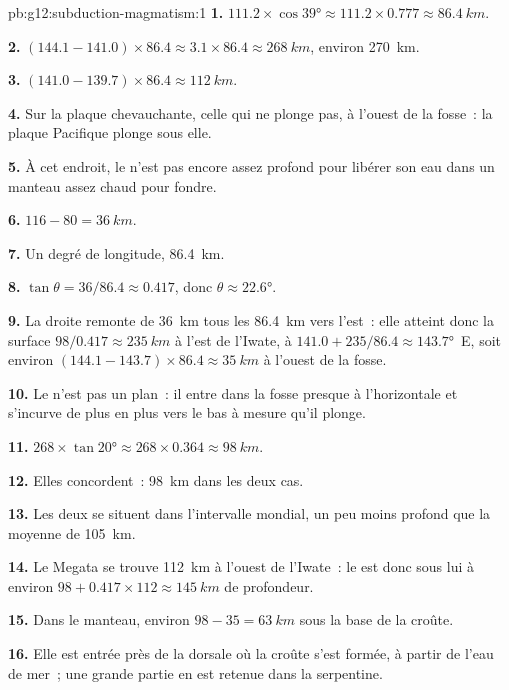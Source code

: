 \begin{solution}{pb:g12:subduction-magmatism:1}
\textbf{1.} $111.2 \times \cos\ang{39} \approx 111.2 \times 0.777 \approx
\qty{86.4}{km}$.

\textbf{2.} $(144.1 - 141.0) \times 86.4 \approx 3.1 \times 86.4 \approx
\qty{268}{km}$, environ \qty{270}{km}.

\textbf{3.} $(141.0 - 139.7) \times 86.4 \approx \qty{112}{km}$.

\textbf{4.} Sur la plaque chevauchante, celle qui ne plonge pas, à l'ouest
de la fosse~: la plaque Pacifique plonge sous elle.

\textbf{5.} À cet endroit, le  n'est pas encore assez
profond pour libérer son eau dans un manteau assez chaud pour fondre.

\textbf{6.} $116 - 80 = \qty{36}{km}$.

\textbf{7.} Un degré de longitude, \qty{86.4}{km}.

\textbf{8.} $\tan\theta = 36/86.4 \approx 0.417$, donc $\theta \approx
\ang{22.6}$.

\textbf{9.} La droite remonte de \qty{36}{km} tous les \qty{86.4}{km} vers
l'est~: elle atteint donc la surface $98/0.417 \approx \qty{235}{km}$ à
l'est de l'Iwate, à $141.0 + 235/86.4 \approx \ang{143.7}$~E, soit environ $(144.1 - 143.7) \times 86.4
\approx \qty{35}{km}$ à l'ouest de la fosse.

\textbf{10.} Le  n'est pas un plan~: il entre dans la fosse presque
à l'horizontale et s'incurve de plus en plus vers le bas à mesure qu'il
plonge.

\textbf{11.} $268 \times \tan\ang{20} \approx 268 \times 0.364 \approx
\qty{98}{km}$.

\textbf{12.} Elles concordent~: \qty{98}{km} dans les deux cas.

\textbf{13.} Les deux se situent dans l'intervalle mondial, un peu moins
profond que la moyenne de \qty{105}{km}.

\textbf{14.} Le Megata se trouve \qty{112}{km} à l'ouest de l'Iwate~: le
 est donc sous lui à environ
$98 + 0.417 \times 112 \approx \qty{145}{km}$ de profondeur.

\textbf{15.} Dans le manteau, environ $98 - 35 = \qty{63}{km}$ sous la base
de la croûte.

\textbf{16.} Elle est entrée près de la dorsale où la croûte s'est formée, à
partir de l'eau de mer~; une grande partie en est retenue dans la
serpentine.


\end{solution}
